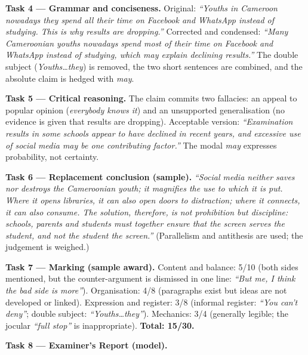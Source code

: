 \documentclass[11pt]{article}
\newcommand{\cle}[1]{{\popxbold\color{popdark}#1}}
\begin{document}
\textbf{Task 4 — Grammar and conciseness.} Original: \emph{``Youths in Cameroon nowadays they spend all their time on Facebook and WhatsApp instead of studying. This is why results are dropping.''} Corrected and condensed: \emph{``Many Cameroonian youths nowadays spend most of their time on Facebook and WhatsApp instead of studying, which may explain declining results.''} The double subject (\emph{Youths\ldots they}) is removed, the two short sentences are combined, and the absolute claim is hedged with \emph{may}.

\textbf{Task 5 — Critical reasoning.} The claim commits two fallacies: an \cle{appeal to popular opinion} (\emph{everybody knows it}) and an \cle{unsupported generalisation} (no evidence is given that results are dropping). Acceptable version: \emph{``Examination results in some schools appear to have declined in recent years, and excessive use of social media may be one contributing factor.''} The modal \emph{may} expresses probability, not certainty.

\textbf{Task 6 — Replacement conclusion (sample).} \emph{``Social media neither saves nor destroys the Cameroonian youth; it magnifies the use to which it is put. Where it opens libraries, it can also open doors to distraction; where it connects, it can also consume. The solution, therefore, is not prohibition but discipline: schools, parents and students must together ensure that the screen serves the student, and not the student the screen.''} (Parallelism and antithesis are used; the judgement is weighed.)

\textbf{Task 7 — Marking (sample award).} Content and balance: 5/10 (both sides mentioned, but the counter-argument is dismissed in one line: \emph{``But me, I think the bad side is more''}). Organisation: 4/8 (paragraphs exist but ideas are not developed or linked). Expression and register: 3/8 (informal register: \emph{``You can't deny''}; double subject: \emph{``Youths\ldots they''}). Mechanics: 3/4 (generally legible; the jocular \emph{``full stop''} is inappropriate). \textbf{Total: 15/30.}

\textbf{Task 8 — Examiner's Report (model).}
\end{document}
